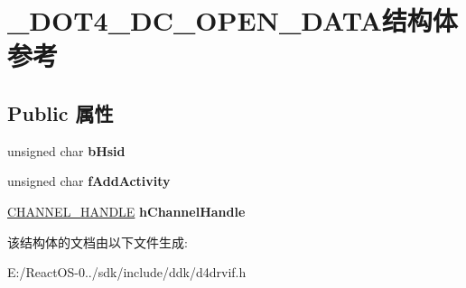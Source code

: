 \hypertarget{struct___d_o_t4___d_c___o_p_e_n___d_a_t_a}{}\section{\+\_\+\+D\+O\+T4\+\_\+\+D\+C\+\_\+\+O\+P\+E\+N\+\_\+\+D\+A\+T\+A结构体 参考}
\label{struct___d_o_t4___d_c___o_p_e_n___d_a_t_a}
\subsection*{Public 属性}
\begin{DoxyCompactItemize}
\item 
\mbox{\label{struct___d_o_t4___d_c___o_p_e_n___d_a_t_a_a71bc89dbf48efd9869e16d5948b55993}} 
unsigned char {\bfseries b\+Hsid}
\item 
\mbox{\label{struct___d_o_t4___d_c___o_p_e_n___d_a_t_a_a49fe4f3ac4342be293d7a179f52987cf}} 
unsigned char {\bfseries f\+Add\+Activity}
\item 
\mbox{\label{struct___d_o_t4___d_c___o_p_e_n___d_a_t_a_af7195064001aa41ddc4cf759a63d1342}} 
\hyperlink{struct_c_h_a_n_n_e_l___h_a_n_d_l_e__}{C\+H\+A\+N\+N\+E\+L\+\_\+\+H\+A\+N\+D\+LE} {\bfseries h\+Channel\+Handle}
\end{DoxyCompactItemize}


该结构体的文档由以下文件生成\+:\begin{DoxyCompactItemize}
\item 
E\+:/\+React\+O\+S-\/0../sdk/include/ddk/d4drvif.\+h\end{DoxyCompactItemize}
